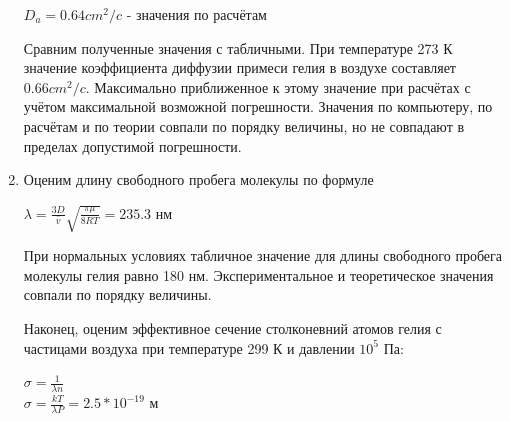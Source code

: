 \documentclass[12pt,a4paper]{article}
\begin{document}
\begin{enumerate}
\newpage

\begin{center}
$D_{a} = 0.64 cm^2/c$ - значения по расчётам\\
\end{center}

Сравним полученные значения с табличными. При температуре 273 К значение коэффициента диффузии примеси гелия в воздухе составляет $0.66 cm^2/c$. Максимально приближенное к этому значение при расчётах с учётом максимальной возможной погрешности. Значения по компьютеру, по расчётам и по теории совпали по порядку величины, но не совпадают в пределах допустимой погрешности. 

\item Оценим длину свободного пробега молекулы по формуле 
\begin{center}
$\lambda = \frac{3D}{\bar v} \sqrt{\frac{\pi \mu }{8RT}} = 235.3 $ нм
\end{center}
При нормальных условиях табличное значение для длины свободного пробега молекулы гелия равно 180 нм. Экспериментальное и теоретическое значения совпали по порядку величины.

Наконец, оценим эффективное сечение столконевний атомов гелия с частицами воздуха при температуре 299 К и давлении $10^5$ Па:

\begin{center}
$\sigma = \frac{1}{\lambda n}$\\
$\sigma = \frac{kT}{\lambda P} = 2.5 * 10^{-19}$ м
\end{center}
\end{enumerate}

\newpage
\end{document}
